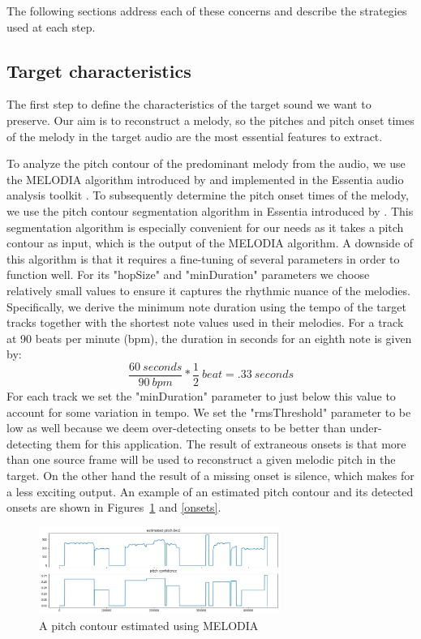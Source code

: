\documentclass{article}
\begin{document}
The following sections address each of these concerns and describe the strategies used at each step.

\subsection{Target characteristics}

The first step to define the characteristics of the target sound we want to preserve.
Our aim is to reconstruct a melody, so the pitches and pitch onset times of the melody in the target audio are the most essential features to extract.

To analyze the pitch contour of the predominant melody from the audio, we use the MELODIA algorithm introduced by \citet{salamon2012melody} and implemented in the Essentia audio analysis toolkit \citep{bogdanov2013essentia}.
To subsequently determine the pitch onset times of the melody, we use the pitch contour segmentation algorithm in Essentia introduced by \citet{mcnab1995signal}.
This segmentation algorithm is especially convenient for our needs as it takes a pitch contour as input, which is the output of the MELODIA algorithm.
A downside of this algorithm is that it requires a fine-tuning of several parameters in order to function well.
For its "hopSize" and "minDuration" parameters we choose relatively small values to ensure it captures the rhythmic nuance of the melodies.
Specifically, we derive the minimum note duration using the tempo of the target tracks together with the shortest note values used in their melodies.
For a track at 90 beats per minute (bpm), the duration in seconds for an eighth note is given by: \[\frac{60\ seconds}{90\ bpm} * \frac{1}{2}\ beat = .33\ seconds\]
For each track we set the "minDuration" parameter to just below this value to account for some variation in tempo.
We set the "rmsThreshold" parameter to be low as well because we deem over-detecting onsets to be better than under-detecting them for this application.
The result of extraneous onsets is that more than one source frame will be used to reconstruct a given melodic pitch in the target.
On the other hand the result of a missing onset is silence, which makes for a less exciting output.
An example of an estimated pitch contour and its detected onsets are shown in Figures~\ref{pitch-contour} and \ref{onsets}.

\begin{figure}[ht]
    \begin{center}
        \includegraphics[width=0.7\textwidth]{pitch-countour}
    \end{center}
    \caption{A pitch contour estimated using MELODIA}
    \label{pitch-contour}
\end{figure}
\end{document}
